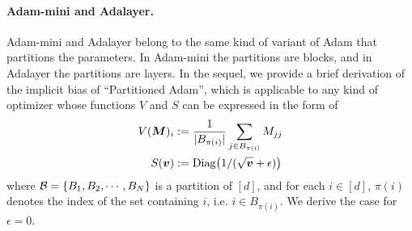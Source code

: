 \paragraph{Adam-mini and Adalayer.} Adam-mini \citep{zhang2025adamminiusefewerlearning} and Adalayer \citep{zhao2025deconstructingmakesgoodoptimizer} belong to the same kind of variant of Adam that partitions the parameters. In Adam-mini the partitions are blocks, and in Adalayer the partitions are layers. In the sequel, we provide a brief derivation of the implicit bias of ``Partitioned Adam'', which is applicable to any kind of optimizer whose functions $V$ and $S$ can be expressed in the form of
\begin{align*}
    V({\bm{M}})_i &:=\frac{1}{|B_{\pi(i)}|}\sum_{j\in B_{\pi(i)}} M_{jj} \\ S({\bm{v}}) &:= \mathrm{Diag}\bigl(1/(\sqrt{{\bm{v}}}+\epsilon)\bigr)
\end{align*}
where $\mathcal{B} = \left\{B_1, B_2, \cdots, B_N\right\}$ is a partition of $[d]$, and for each $i \in [d]$, $\pi(i)$ denotes the index of the set containing $i$, i.e. $i \in B_{\pi(i)}$.
We derive the case for $\epsilon = 0$.

